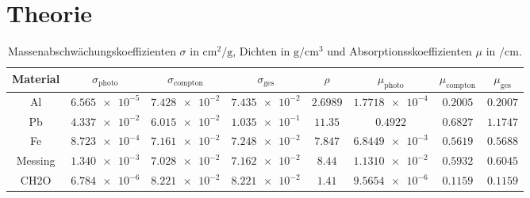 \section{Theorie}
\label{sec:Theorie}

\begin{table}[htp]
	\begin{center}
    \caption{Massenabschwächungskoeffizienten $\sigma$ in $\si{\centi\meter\squared\per\gram}$, Dichten in $\si{\gram\per\centi\meter\cubed}$ und Absorptionsskoeffizienten $\mu$ in $\si{\per\centi\meter}$.}
    \label{tab:dicke}
		\begin{tabular}{cccccccc}
		\toprule
			Material & $\sigma_{\text{photo}}$ & $\sigma_{\text{compton}}$ & $\sigma_{\text{ges}}$ & $\rho$ & $\mu_{\text{photo}}$ & $\mu_{\text{compton}}$ & $\mu_{\text{ges}}$\\
			\midrule
			Al & $\num{6.565e-5}$ & $\num{7.428e-2}$ & $\num{7.435e-2}$ & $\num{2.6989}$ & $\num{1.7718e-4}$ & $\num{0.2005}$ & $\num{0.2007}$\\
      Pb & $\num{4.337e-2}$ & $\num{6.015e-2}$ & $\num{1.035e-1}$ & $\num{11.35}$ & $\num{0.4922}$ & $\num{0.6827}$ & $\num{1.1747}$\\
      Fe & $\num{8.723e-4}$ & $\num{7.161e-2}$ & $\num{7.248e-2}$ & $\num{7.847}$ & $\num{6.8449e-3}$ & $\num{0.5619}$ & $\num{0.5688}$\\
      Messing & $\num{1.340e-3}$ & $\num{7.028e-2}$ & $\num{7.162e-2}$ & $\num{8.44}$ & $\num{1.1310e-2}$ & $\num{0.5932}$ & $\num{0.6045}$\\
      CH2O & $\num{6.784e-6}$ & $\num{8.221e-2}$ & $\num{8.221e-2}$ & $\num{1.41}$ & $\num{9.5654e-6}$ & $\num{0.1159}$ & $\num{0.1159}$\\
		\bottomrule
		\end{tabular}
	\end{center}
\end{table}
